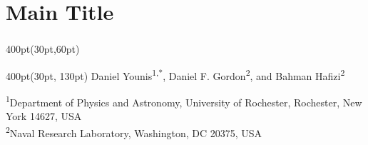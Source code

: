 \section{Main Title}
\begin{frame}
\frametitle{}
\framesubtitle{}

\small
\begin{textblock*}{400pt}(30pt,60pt)
\end{textblock*}

\begin{textblock*}{400pt}(30pt, 130pt)
\centering\footnotesize
Daniel Younis\textsuperscript{1,*},
Daniel F. Gordon\textsuperscript{2},
and Bahman Hafizi\textsuperscript{2}

\vspace{10pt}
\tiny
\textsuperscript{1}Department of Physics and Astronomy, University of Rochester,
Rochester, New York 14627, USA \\
\textsuperscript{2}Naval Research Laboratory, Washington, DC 20375, USA
\end{textblock*}


\end{frame}

